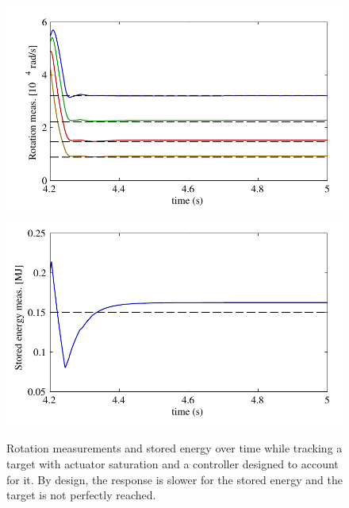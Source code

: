 \documentclass[12pt,lot, lof]{puthesis}
\begin{document}
\begin{figure}[htbp]
	\centering
	\includegraphics{chap10/good_y_sat_sensors}
	\includegraphics{chap10/good_y_sat_energy}
	\caption{Rotation measurements and stored energy over time while tracking a target with actuator saturation and a controller designed to account for it.
		By design, the response is slower for the stored energy and the target is not perfectly reached.}
	\label{fig:good_y_sat}
\end{figure}
\end{document}
